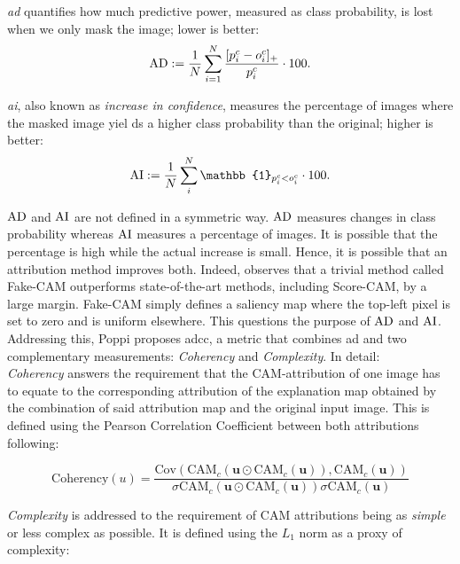 \emph{\gls{ad}}  quantifies how much predictive power, measured as class probability, 
is lost when we only mask the image; lower is better:
\begin{equation}
	\operatorname{AD} \mathrel{:=} \frac{1}{N} \sum_{i=1}^N \frac{[p^c_i - o^c_i]_+}{p^c_i} \cdot 100.
\label{eq:ad}
\end{equation}

\emph{\gls{ai}}, also known as \emph{increase in confidence}, measures the 
percentage of images where the masked image yiel ds a higher class probability than the original; 
higher is better:
\begin{equation}
	\AI \defn \frac{1}{N} \sum_i^N \mathbb{1}_{p^c_i < o^c_i} \cdot 100.
\label{eq:ai}
\end{equation}

$\operatorname{AD}$ and $\operatorname{AI}$ are not defined in a symmetric way. $\operatorname{AD}$ measures changes in class probability 
whereas $\operatorname{AI}$ measures a percentage of images. It is possible that the percentage is high while 
the actual increase is small. Hence, it is possible that an attribution method improves both. 
Indeed, \autocite{poppi2021revisiting} observes that a trivial method called Fake-CAM outperforms 
state-of-the-art methods, including Score-CAM, by a large margin. Fake-CAM simply defines a 
saliency map where the top-left pixel is set to zero and is uniform elsewhere. 
This questions the purpose of $\operatorname{AD}$ and $\operatorname{AI}$. Addressing this, Poppi proposes \gls{adcc}, a metric 
that combines \gls{ad} and two complementary measurements: \emph{Coherency} and \emph{Complexity}.
In detail:\\

\emph{Coherency} answers the requirement that the CAM-attribution of one image has to equate to the 
corresponding attribution of the explanation map obtained by the combination of said attribution 
map and the original input image. This is defined using the Pearson Correlation Coefficient between 
both attributions following:

\begin{equation}
	\mbox{Coherency}(u) = \frac{\mbox{Cov}\left(\mbox{CAM}_c(\mathbf{u}\odot \mbox{CAM}_c(\mathbf{u})),
	                       \mbox{CAM}_c(\mathbf{u})\right)}{\sigma\mbox{CAM}_c(\mathbf{u}
						   \odot \mbox{CAM}_c(\mathbf{u}))\sigma\mbox{CAM}_c(\mathbf{u})}
\end{equation}

\emph{Complexity} is addressed to the requirement of CAM attributions being as \emph{simple} or 
less complex as possible. It is defined using the $L_1$ norm as a proxy of complexity:


